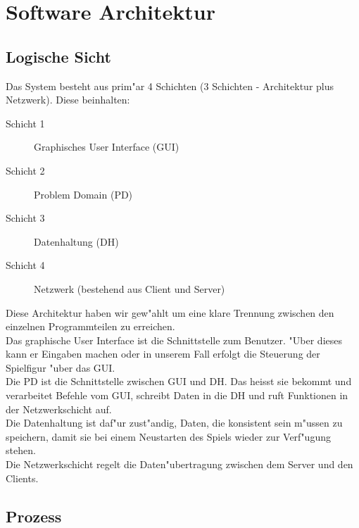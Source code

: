 \chapter{Software Architektur}

\section{Logische Sicht}
Das System besteht aus prim"ar 4 Schichten (3  Schichten - Architektur plus Netzwerk). Diese beinhalten:
\begin{description}
\item[Schicht 1] Graphisches User Interface (GUI)
\item[Schicht 2] Problem Domain (PD)
\item[Schicht 3] Datenhaltung (DH)
\item[Schicht 4] Netzwerk (bestehend aus Client und Server)
\end{description}

Diese Architektur haben wir gew"ahlt um eine klare Trennung zwischen den einzelnen Programmteilen zu erreichen. \\
Das graphische User Interface ist die Schnittstelle zum Benutzer. "Uber dieses kann er Eingaben machen oder in unserem Fall erfolgt die Steuerung
der Spielfigur "uber das GUI. \\
Die PD ist die Schnittstelle zwischen GUI und DH. Das heisst sie bekommt und verarbeitet Befehle vom GUI, schreibt Daten in die DH und
ruft Funktionen in der Netzwerkschicht auf. \\
Die Datenhaltung ist daf"ur zust"andig, Daten, die konsistent sein m"ussen zu speichern, damit sie bei einem Neustarten des Spiels wieder
zur Verf"ugung stehen. \\
Die Netzwerkschicht regelt die Daten"ubertragung zwischen dem Server und den Clients.

\section{Prozess}


